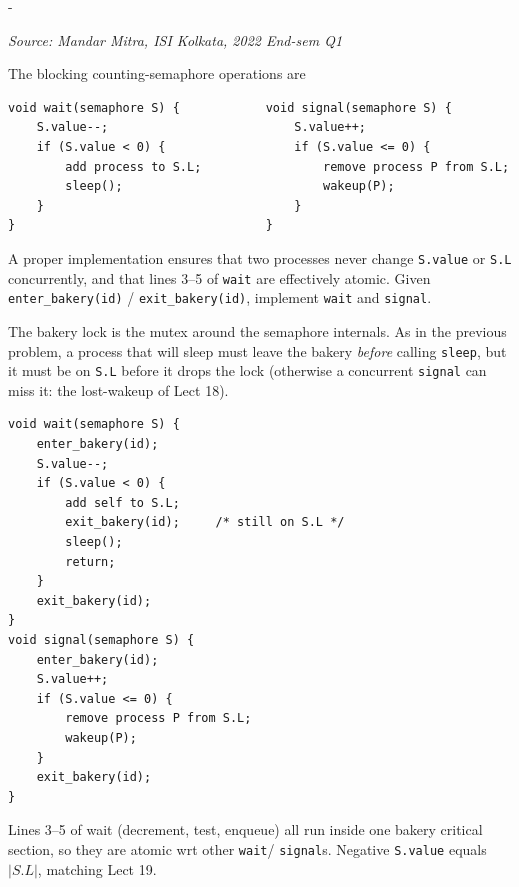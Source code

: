 \documentclass[11pt,a4paper]{article}
\makeatletter
\newcommand{\keepspace}[1]{\par\penalty-100\begingroup
  \setlength{\dimen@}{#1}\dimen@ii\pagegoal\advance\dimen@ii-\pagetotal
  \ifdim\dimen@>\dimen@ii\ifdim\dimen@ii>\z@\vfil\fi\break\fi\endgroup}
\newcounter{qn}[section]
\newenvironment{Qn}[4]{%
  \refstepcounter{qn}\keepspace{7\baselineskip}%
  \begin{tcolorbox}[qboxstyle, title={Q\thesection.\theqn\ \ [#1 \textbar\ #2]\ \ #4}]%
  {\footnotesize\color{g3}\textit{Source: #3}}\par\smallskip%
}{%
  \end{tcolorbox}%
}
\newenvironment{Sol}{%
  \begin{tcolorbox}[sboxstyle, title={Solution}]%
}{%
  \end{tcolorbox}\vspace{0.35em}%
}
\makeatother
\begin{document}
\begin{Qn}{Medium-Hard}{Lect 19}{Mandar Mitra, ISI Kolkata, 2022 End-sem Q1}{Blocking wait/signal inside the bakery}
The blocking counting-semaphore operations are
\begin{lstlisting}[numbers=none]
void wait(semaphore S) {            void signal(semaphore S) {
    S.value--;                          S.value++;
    if (S.value < 0) {                  if (S.value <= 0) {
        add process to S.L;                 remove process P from S.L;
        sleep();                            wakeup(P);
    }                                   }
}                                   }
\end{lstlisting}
A proper implementation ensures that two processes never change
\texttt{S.value} or \texttt{S.L} concurrently, and that lines 3--5 of
\texttt{wait} are effectively atomic. Given
\texttt{enter\_bakery(id)} / \texttt{exit\_bakery(id)}, implement
\texttt{wait} and \texttt{signal}.
\end{Qn}
\begin{Sol}
The bakery lock is the mutex around the semaphore internals. As in the
previous problem, a process that will sleep must leave the bakery
\emph{before} calling \texttt{sleep}, but it must be on \texttt{S.L}
before it drops the lock (otherwise a concurrent \texttt{signal} can
miss it: the lost-wakeup of Lect 18).
\begin{lstlisting}[numbers=none]
void wait(semaphore S) {
    enter_bakery(id);
    S.value--;
    if (S.value < 0) {
        add self to S.L;
        exit_bakery(id);     /* still on S.L */
        sleep();
        return;
    }
    exit_bakery(id);
}
void signal(semaphore S) {
    enter_bakery(id);
    S.value++;
    if (S.value <= 0) {
        remove process P from S.L;
        wakeup(P);
    }
    exit_bakery(id);
}
\end{lstlisting}
Lines 3--5 of wait (decrement, test, enqueue) all run inside one bakery
critical section, so they are atomic wrt other \texttt{wait}/
\texttt{signal}s. Negative \texttt{S.value} equals $|S.L|$, matching
Lect 19.
\end{Sol}
\end{document}
